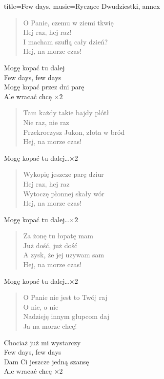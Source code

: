\newpage
\begin{song}{title={Few days}, music={Ryczące Dwudziestki}, annex}
\begin{multicols}{2}
    \begin{verse}
        O Panie, czemu w ziemi tkwię \\
		Hej raz, hej raz! \\
		I macham szuflą cały dzień? \\
		Hej, na morze czas! 
    \end{verse}
    \begin{chorus}
        Mogę kopać tu dalej \\
		Few days, few days \\
		Mogę kopać przez dni parę \\ 
		Ale wracać chcę  $\times 2$ 
    \end{chorus}
    \begin{verse}
        Tam każdy takie bajdy plótł \\
		Nie raz, nie raz \\
		Przekroczysz Jukon, złota w bród \\
		Hej, na morze czas! 
    \end{verse}
    \begin{chorus}
        Mogę kopać tu dalej\ldots $\times 2$ 
    \end{chorus}
    \begin{verse}
        Wykopię jeszcze parę dziur \\
		Hej raz, hej raz \\
		Wytoczę płonnej skały wór \\
		Hej, na morze czas!
    \end{verse}
    \begin{chorus}
        Mogę kopać tu dalej\ldots $\times 2$ 
    \end{chorus}
    \begin{verse}
        Za żonę tu łopatę mam \\
		Już dość, już dość \\
		A zysk, że jej uzywam sam \\
		Hej, na morze czas!
    \end{verse}
    \begin{chorus}
        Mogę kopać tu dalej\ldots $\times 2$ 
    \end{chorus}
    \begin{verse}
        O Panie nie jest to Twój raj \\
		O nie, o nie \\
		Nadzieję innym głupcom daj \\
		Ja na morze chcę!
    \end{verse}
    \begin{chorus}
        Chociaż już mi wystarczy \\
		Few days, few days \\
		Dam Ci jeszcze jedną szansę \\
		Ale wracać chcę $\times 2$ 
    \end{chorus}
\end{multicols}
\end{song}

